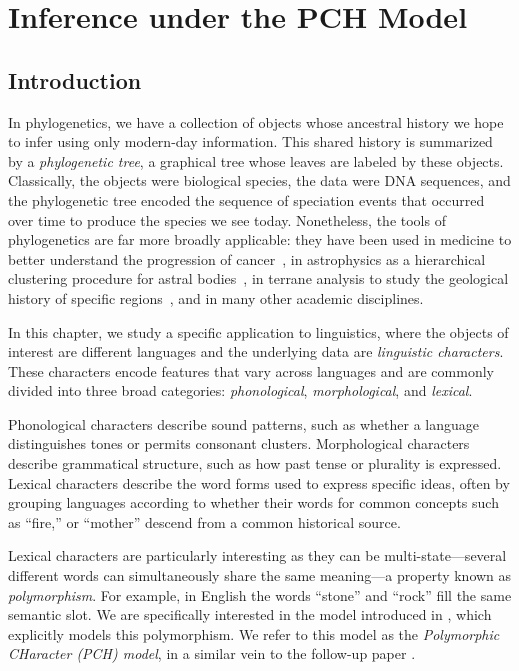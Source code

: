 \chapter{Inference under the PCH Model}

\section{Introduction}

In phylogenetics, we have a collection of objects whose ancestral history we hope to infer
using only modern-day information. This shared history is summarized by a \textit{phylogenetic tree},
a graphical tree whose leaves are labeled by these objects. Classically, the objects were biological species,
the data were DNA sequences, and the phylogenetic tree encoded the sequence of
speciation events that occurred over time to produce the species we see today. Nonetheless, the tools of phylogenetics are far
more broadly applicable: they have been used in medicine to better understand the
progression of cancer~\cite{somarelli2017_phylooncology_cancer_phylogenetic_analysis}, in astrophysics as a hierarchical clustering procedure for astral
 bodies~\cite{fraixburnet2015_multivariate_classification_astronomy}, in terrane analysis to study the geological history of specific
 regions~\cite{michaux2018_cladistic_methods_terrane_analysis}, and in many other academic disciplines.

In this chapter, we study a specific application to linguistics, where the objects of interest are different
languages and the underlying data are \textit{linguistic characters}. These characters encode features
that vary across languages and are commonly divided into three broad categories: \textit{phonological},
 \textit{morphological}, and \textit{lexical}.

 Phonological characters describe sound patterns,
 such as whether a language distinguishes tones or permits consonant clusters. Morphological characters
 describe grammatical structure, such as how past tense or plurality is expressed. Lexical characters describe the word
 forms used to express specific ideas, often by grouping languages according to whether their words for
  common concepts such as ``fire,'' or ``mother'' descend from a common historical source. 
  
  Lexical characters are
  particularly interesting as they can be multi-state---several different words can simultaneously share
  the same meaning---a property known as \textit{polymorphism}. For example, in English the words ``stone'' and ``rock'' fill
  the same semantic slot. We are specifically interested in the model introduced in
\cite{canby2024_polymorphism_linguistic_phylogenetics}, which explicitly models this polymorphism. We refer to this model as the
\textit{Polymorphic CHaracter (PCH) model}, in a similar vein to the follow-up paper \cite{evans2026_canby_identifiability}.

